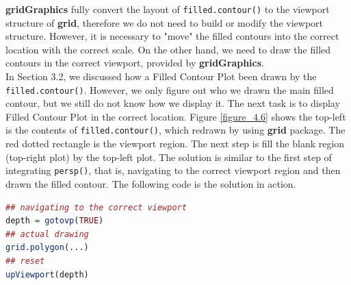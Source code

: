 \documentclass{report}
\begin{document}
\textbf{gridGraphics} fully convert the layout of \texttt{filled.contour()} to the viewport structure of \textbf{grid}, therefore we do not need to build or modify the viewport structure. However, it is necessary to "move" the filled contours into the correct location with the correct scale. On the other hand, we need to draw the filled contours in the correct viewport, provided by \textbf{gridGraphics}.\\

In Section 3.2, we discussed how a Filled Contour Plot been drawn by the \texttt{filled.contour()}. However, we only figure out who we drawn the main filled contour, but we still do not know how we display it. The next task is to display Filled Contour Plot in the correct location. Figure \ref{figure_4.6} shows the top-left is the contents of \texttt{filled.contour()}, which redrawn by using \textbf{grid} package. The red dotted rectangle is the viewport region. The next step is fill the blank region (top-right plot) by the top-left plot. The solution is similar to the first step of integrating \texttt{persp()}, that is, navigating to the correct viewport region and then drawn the filled contour. The following code is the solution in action.
\begin{lstlisting}[language = R]
## navigating to the correct viewport
depth = gotovp(TRUE)
## actual drawing
grid.polygon(...)
## reset
upViewport(depth)
\end{lstlisting}
\end{document}
